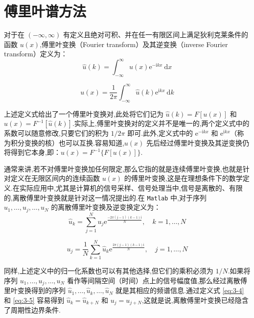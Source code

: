 \section{傅里叶谱方法}

对于在 $(-\infty, \infty)$ 有定义且绝对可积、并在任一有限区间上满足狄利克莱条件的函数 $u(x)$,傅里叶变换（Fourier transform）及其逆变换（inverse Fourier transform）定义为：
\begin{equation}
    \hat{u}(k) = \int_{-\infty}^{\infty} u(x) \mathrm{e}^{-\mathrm{i} k x} \mathrm{~d} x \label{eq:3-1}
\end{equation}

\begin{equation}
    u(x) = \frac{1}{2 \pi} \int_{-\infty}^{\infty} \hat{u}(k) \mathrm{e}^{\mathrm{i} k x} \mathrm{~d} k \label{eq:3-2}
\end{equation}

上述定义式给出了一个傅里叶变换对,此处将它们记为 $\hat{u}(k) = F[u(x)]$ 和 $u(x) = F^{-1}[\hat{u}(k)]$.实际上,傅里叶变换对的定义并不是唯一的,两个定义式中的系数可以随意修改,只要它们的积为 $1 / 2 \pi$ 即可.此外,定义式中的 $\mathrm{e}^{-\mathrm{i} k x}$ 和 $\mathrm{e}^{\mathrm{i} k x}$（称为积分变换的核）也可以互换.容易知道,$u(x)$ 先后经过傅里叶变换及其逆变换仍将得到它本身,即：$u(x) = F^{-1}\{F[u(x)]\}$.

通常来讲,若不对傅里叶变换加任何限定,那么它指的就是连续傅里叶变换,也就是针对定义在无限区间内的连续函数 $u(x)$ 的傅里叶变换,这是在理想条件下的数学定义.在实际应用中,尤其是计算机的信号采样、信号处理当中,信号是离散的、有限的,离散傅里叶变换就是针对这一情况提出的.在 \texttt{Matlab} 中,对于序列 $u_1, \ldots, u_j, \ldots, u_N$ 的离散傅里叶变换及逆变换定义为：
\begin{equation}
    \hat{u}_k = \sum_{j=1}^N u_j \mathrm{e}^{\frac{-2 \pi(j-1)(k-1) \mathrm{i}}{N}}, \quad k=1, \ldots, N \label{eq:3-4}
\end{equation}

\begin{equation}
    u_j = \frac{1}{N} \sum_{k=1}^N \hat{u}_k \mathrm{e}^{\frac{2 \pi(j-1)(k-1) \mathrm{i}}{N}}, \quad j=1, \ldots, N \label{eq:3-5}
\end{equation}

同样,上述定义中的归一化系数也可以有其他选择,但它们的乘积必须为 $1 / N$.如果将序列 $u_1, \ldots, u_j, \ldots, u_N$ 看作等间隔空间（时间）点上的信号幅度值,那么经过离散傅里叶变换得到的序列 $\hat{u}_1, \ldots, \hat{u}_k, \ldots, \hat{u}_N$ 就是其相应的频谱信息.通过定义式 \eqref{eq:3-4} 和 \eqref{eq:3-5} 容易得到 $\hat{u}_k = \hat{u}_{k+N}$ 和 $u_j = u_{j+N}$,这就是说,离散傅里叶变换已经隐含了周期性边界条件.


